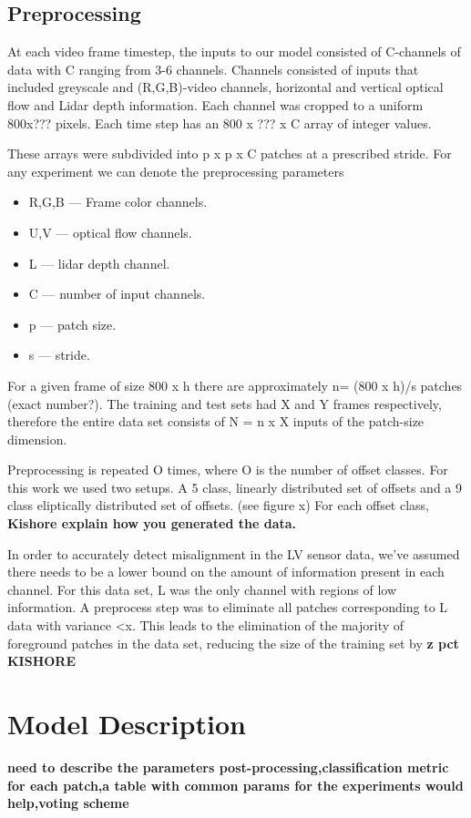 \documentclass{article}
\begin{document}
\subsection{Preprocessing}
At each video frame timestep, the inputs to our model consisted of C-channels of data with C ranging from 3-6 channels. Channels consisted of inputs that included greyscale and (R,G,B)-video channels, horizontal and vertical optical flow and Lidar depth information. Each channel was cropped to a uniform 800x??? pixels. Each time step has an 800 x ??? x C array of integer values.

These arrays were subdivided into p x p x C patches at a prescribed stride. For any experiment we can denote the preprocessing parameters 
\begin{itemize}
\item R,G,B --- Frame color channels.
\item U,V --- optical flow channels.
\item L --- lidar depth channel.
\item C --- number of input channels.
\item p --- patch size.
\item s --- stride.
\end{itemize}  

For a given frame of size 800 x h there are approximately n= (800 x h)/s patches (exact number?). The training and test sets had X and Y frames respectively, therefore the entire data set consists of  N = n x X inputs of the patch-size dimension. 

Preprocessing is repeated O times, where O is the number of offset classes. For this work we used two setups. A 5 class, linearly distributed set of offsets and a 9 class eliptically distributed set of offsets. (see figure x) For each offset class, \textbf{Kishore explain how you generated the data.} 

In order to accurately detect misalignment in the LV sensor data, we've assumed there needs to be a lower bound on the amount of information present in each channel. For this data set, L was the only channel with regions of low information. A preprocess step was to eliminate all patches corresponding to L data with variance <x. This leads to the elimination of the majority of foreground patches in the data set, reducing the size of the training set by \textbf{z pct KISHORE}

\section{Model Description}
\textbf{need to describe the parameters post-processing,classification metric for each patch,a table with common params for the experiments would help,voting scheme}
\end{document}
